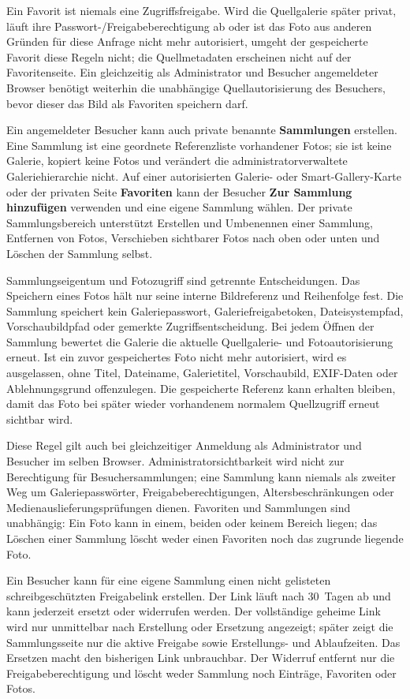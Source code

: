\documentclass[11pt,a4paper]{article}
\newcommand{\ui}[1]{\textbf{#1}}
\begin{document}
Ein Favorit ist niemals eine Zugriffsfreigabe. Wird die Quellgalerie später
privat, läuft ihre Passwort-/Freigabeberechtigung ab oder ist das Foto aus
anderen Gründen für diese Anfrage nicht mehr autorisiert, umgeht der
gespeicherte Favorit diese Regeln nicht; die Quellmetadaten erscheinen nicht auf
der Favoritenseite. Ein gleichzeitig als Administrator und Besucher angemeldeter
Browser benötigt weiterhin die unabhängige Quellautorisierung des Besuchers,
bevor dieser das Bild als Favoriten speichern darf.

Ein angemeldeter Besucher kann auch private benannte \ui{Sammlungen} erstellen.
Eine Sammlung ist eine geordnete Referenzliste vorhandener Fotos; sie ist keine
Galerie, kopiert keine Fotos und verändert die administratorverwaltete
Galeriehierarchie nicht. Auf einer autorisierten Galerie- oder
Smart-Gallery-Karte oder der privaten Seite \ui{Favoriten} kann der Besucher
\ui{Zur Sammlung hinzufügen} verwenden und eine eigene Sammlung wählen. Der
private Sammlungsbereich unterstützt Erstellen und Umbenennen einer Sammlung,
Entfernen von Fotos, Verschieben sichtbarer Fotos nach oben oder unten und
Löschen der Sammlung selbst.

Sammlungseigentum und Fotozugriff sind getrennte Entscheidungen. Das Speichern
eines Fotos hält nur seine interne Bildreferenz und Reihenfolge fest. Die
Sammlung speichert kein Galeriepasswort, Galeriefreigabetoken, Dateisystempfad,
Vorschaubildpfad oder gemerkte Zugriffsentscheidung. Bei jedem Öffnen der
Sammlung bewertet die Galerie die aktuelle Quellgalerie- und Fotoautorisierung
erneut. Ist ein zuvor gespeichertes Foto nicht mehr autorisiert, wird es
ausgelassen, ohne Titel, Dateiname, Galerietitel, Vorschaubild, EXIF-Daten oder
Ablehnungsgrund offenzulegen. Die gespeicherte Referenz kann erhalten bleiben,
damit das Foto bei später wieder vorhandenem normalem Quellzugriff erneut
sichtbar wird.

Diese Regel gilt auch bei gleichzeitiger Anmeldung als Administrator und
Besucher im selben Browser. Administratorsichtbarkeit wird nicht zur
Berechtigung für Besuchersammlungen; eine Sammlung kann niemals als zweiter Weg
um Galeriepasswörter, Freigabeberechtigungen, Altersbeschränkungen oder
Medienauslieferungsprüfungen dienen. Favoriten und Sammlungen sind unabhängig:
Ein Foto kann in einem, beiden oder keinem Bereich liegen; das Löschen einer
Sammlung löscht weder einen Favoriten noch das zugrunde liegende Foto.

Ein Besucher kann für eine eigene Sammlung einen nicht gelisteten
schreibgeschützten Freigabelink erstellen. Der Link läuft nach 30~Tagen ab und
kann jederzeit ersetzt oder widerrufen werden. Der vollständige geheime Link
wird nur unmittelbar nach Erstellung oder Ersetzung angezeigt; später zeigt die
Sammlungsseite nur die aktive Freigabe sowie Erstellungs- und Ablaufzeiten. Das
Ersetzen macht den bisherigen Link unbrauchbar. Der Widerruf entfernt nur die
Freigabeberechtigung und löscht weder Sammlung noch Einträge, Favoriten oder
Fotos.
\end{document}
